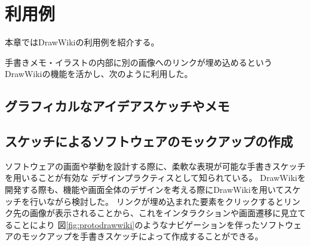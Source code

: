 \chapter{利用例}
\label{chap:riyourei}

本章ではDrawWikiの利用例を紹介する。

\newpage

手書きメモ・イラストの内部に別の画像へのリンクが埋め込めるというDrawWikiの機能を活かし、次のように利用した。


\section{グラフィカルなアイデアスケッチやメモ}


\section{スケッチによるソフトウェアのモックアップの作成}
\label{drawiki:mockup}
ソフトウェアの画面や挙動を設計する際に、柔軟な表現が可能な手書きスケッチを用いることが有効な
デザインプラクティスとして知られている。
DrawWikiを開発する際も、機能や画面全体のデザインを考える際にDrawWikiを用いてスケッチを行いながら検討した。
リンクが埋め込まれた要素をクリックするとリンク先の画像が表示されることから、これをインタラクションや画面遷移に見立てることにより
図\ref{fig:protodrawwiki}のようなナビゲーションを伴ったソフトウェアのモックアップを手書きスケッチによって作成することができる。

